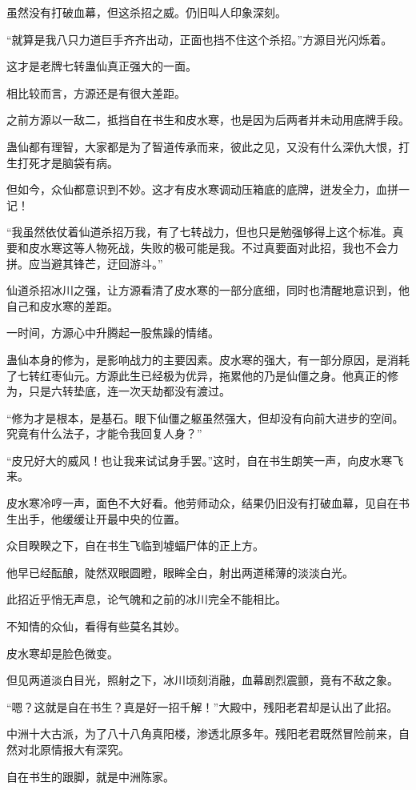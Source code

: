 \begin{this_body}
虽然没有打破血幕，但这杀招之威。仍旧叫人印象深刻。

“就算是我八只力道巨手齐齐出动，正面也挡不住这个杀招。”方源目光闪烁着。

这才是老牌七转蛊仙真正强大的一面。

相比较而言，方源还是有很大差距。

之前方源以一敌二，抵挡自在书生和皮水寒，也是因为后两者并未动用底牌手段。

蛊仙都有理智，大家都是为了智道传承而来，彼此之见，又没有什么深仇大恨，打生打死才是脑袋有病。

但如今，众仙都意识到不妙。这才有皮水寒调动压箱底的底牌，迸发全力，血拼一记！

“我虽然依仗着仙道杀招万我，有了七转战力，但也只是勉强够得上这个标准。真要和皮水寒这等人物死战，失败的极可能是我。不过真要面对此招，我也不会力拼。应当避其锋芒，迂回游斗。”

仙道杀招冰川之强，让方源看清了皮水寒的一部分底细，同时也清醒地意识到，他自己和皮水寒的差距。

一时间，方源心中升腾起一股焦躁的情绪。

蛊仙本身的修为，是影响战力的主要因素。皮水寒的强大，有一部分原因，是消耗了七转红枣仙元。方源此生已经极为优异，拖累他的乃是仙僵之身。他真正的修为，只是六转垫底，连一次天劫都没有渡过。

“修为才是根本，是基石。眼下仙僵之躯虽然强大，但却没有向前大进步的空间。究竟有什么法子，才能令我回复人身？”

“皮兄好大的威风！也让我来试试身手罢。”这时，自在书生朗笑一声，向皮水寒飞来。

皮水寒冷哼一声，面色不大好看。他劳师动众，结果仍旧没有打破血幕，见自在书生出手，他缓缓让开最中央的位置。

众目睽睽之下，自在书生飞临到墟蝠尸体的正上方。

他早已经酝酿，陡然双眼圆瞪，眼眸全白，射出两道稀薄的淡淡白光。

此招近乎悄无声息，论气魄和之前的冰川完全不能相比。

不知情的众仙，看得有些莫名其妙。

皮水寒却是脸色微变。

但见两道淡白目光，照射之下，冰川顷刻消融，血幕剧烈震颤，竟有不敌之象。

“嗯？这就是自在书生？真是好一招千解！”大殿中，残阳老君却是认出了此招。

中洲十大古派，为了八十八角真阳楼，渗透北原多年。残阳老君既然冒险前来，自然对北原情报大有深究。

自在书生的跟脚，就是中洲陈家。


\end{this_body}
